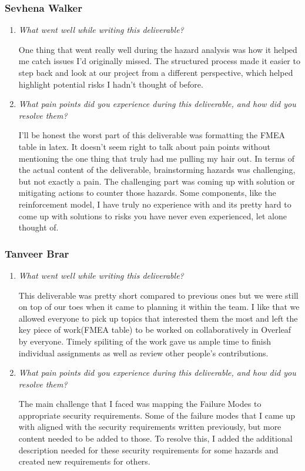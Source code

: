 \documentclass{article}
\newcounter{hazard}
\begin{document}
\subsubsection*{Sevhena Walker}

\begin{enumerate}
  \item \textit{What went well while writing this deliverable?}
  
  One thing that went really well during the hazard analysis was how it helped me catch issues I’d originally missed. The structured process made it easier to step back and look at our project from a different perspective, which helped highlight potential risks I hadn’t thought of before. 

  \item \textit{What pain points did you experience during this deliverable, and how did you resolve them?}
  
  I'll be honest the worst part of this deliverable was formatting the FMEA table in latex. It doesn't seem right to talk about pain points without mentioning the one thing that truly had me pulling my hair out. In terms of the actual content of the deliverable, brainstorming hazards was challenging, but not exactly a pain. The challenging part was coming up with solution or mitigating actions to counter those hazards. Some components, like the reinforcement model, I have truly no experience with and its pretty hard to come up with solutions to risks you have never even experienced, let alone thought of. 
  
\end{enumerate}

\subsubsection*{Tanveer Brar}

\begin{enumerate}
    \item \textit{What went well while writing this deliverable?}

    This deliverable was pretty short compared to previous ones but we were still on top of our toes when it came to planning it within the team. I like that we allowed everyone to pick up topics that interested them the most and left the key piece of work(FMEA table) to be worked on collaboratively in Overleaf by everyone. Timely spiliting of the work gave us ample time to finish individual assignments as well as review other people's contributions.

    \item \textit{What pain points did you experience during this deliverable, and how did you resolve them?}

    The main challenge that I faced was mapping the Failure Modes to appropriate security requirements. Some of the failure modes that I came up with aligned with the security requirements written previously, but more content needed to be added to those. To resolve this, I added the additional description needed for these security requirements for some hazards and created new requirements for others.

\end{enumerate}
\end{document}
